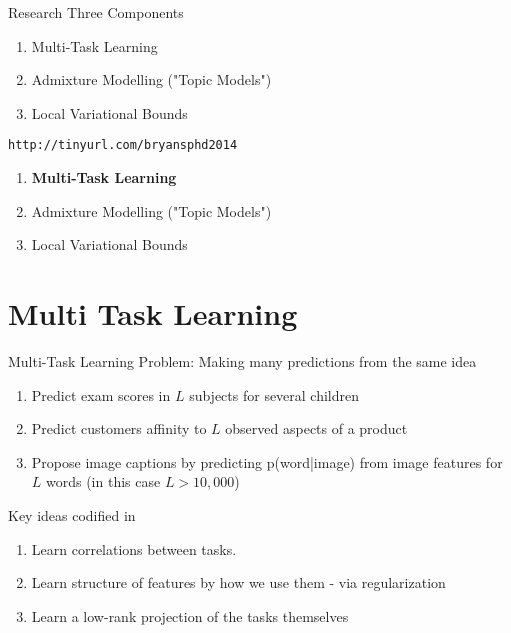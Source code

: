 \documentclass[xcolor=dvipsnames]{beamer}
\begin{document}
\begin{frame}{Research}
Three Components
 {
    \begin{enumerate}
        \item Multi-Task Learning
        \item Admixture Modelling ("Topic Models")
        \item Local Variational Bounds
    \end{enumerate}
}

 {
    \bigskip
    \texttt{http://tinyurl.com/bryansphd2014}
}

 {

    \begin{enumerate}
        \item { \bf Multi-Task Learning }
        \item {\color{gray} Admixture Modelling ("Topic Models")}
        \item {\color{gray} Local Variational Bounds}
    \end{enumerate}


}
\end{frame}




\section{Multi Task Learning}
\begin{frame}{Multi-Task Learning}
Problem: Making many predictions from the same idea
\begin{enumerate}
    \item Predict exam scores in $L$ subjects for several children\cite{Bonilla2008}
    \item Predict customers affinity to $L$ observed aspects of a product\cite{Allenby1999}
    \item Propose image captions by predicting p(word|image) from image features for $L$ words (in this case $L > 10,000$)\cite{Archambeau2011}
\end{enumerate}

\medskip 
\pause

Key ideas codified in \cite{Caruana1997}
\begin{enumerate}
    \item Learn correlations between tasks.
    \item Learn structure of features by how we use them - via regularization
    \item Learn a low-rank projection of the tasks themselves
\end{enumerate}
\end{frame}
\end{document}

